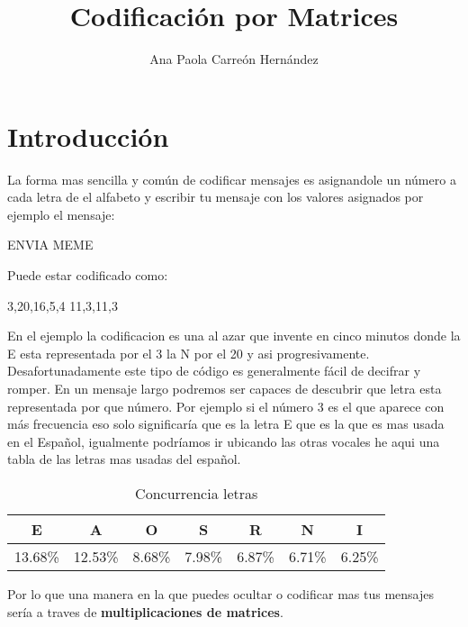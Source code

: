 \documentclass[12pt,letterpaper]{report}
\author{Ana Paola Carreón Hernández}
\title{Codificación por Matrices}
\begin{document}
\maketitle
\newpage
\section*{Introducción}
La forma mas sencilla y común de codificar mensajes es asignandole un número a cada letra de el alfabeto y escribir tu mensaje con los valores asignados por ejemplo el mensaje:
\begin{center}
ENVIA MEME
\end{center}
Puede estar codificado como:
\begin{center}
3,20,16,5,4 11,3,11,3
\end{center}
En el ejemplo la codificacion es una al azar que invente en cinco minutos donde la E esta representada por el 3 la N por el 20 y asi progresivamente. Desafortunadamente este tipo de código es generalmente fácil de decifrar y romper. En un mensaje largo podremos ser capaces de descubrir que letra esta representada por que número. Por ejemplo si el número 3 es el que aparece con más frecuencia eso solo significaría que es la letra E que es la que es mas usada en el Español, igualmente podríamos ir ubicando las otras vocales he aqui una tabla de las letras mas usadas del español.



\begin{table}[h]
\begin{center}
\caption{Concurrencia letras} 
\begin{tabular}{|c|c|c|c|c|c|c|}
\hline
E & A & O & S & R & N & I \\ \hline
13.68\% & 12.53\% & 8.68\% & 7.98\% & 6.87\% & 6.71\% & 6.25\% \\ \hline
\end{tabular}
\end{center}
\end{table}

Por lo que una manera en la que puedes ocultar o codificar mas tus mensajes sería a traves de \textbf{multiplicaciones de matrices}.
\end{document}
